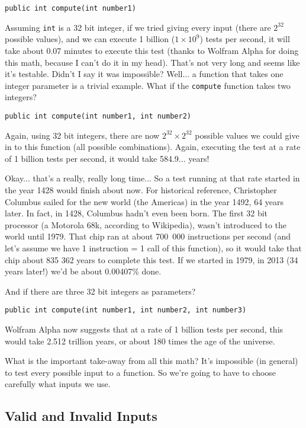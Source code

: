 \texttt{public int compute(int number1)}

Assuming \texttt{int} is a 32 bit integer, if we tried giving every input (there are $2^{32}$ possible values), and we can execute 1 billion ($1 \times 10^{9}$) tests per second, it will take about 0.07 minutes to execute this test (thanks to Wolfram Alpha for doing this math, because I can't do it in my head). That's not very long and seems like it's testable. Didn't I say it was impossible? Well... a function that takes one integer parameter is a trivial example. What if the \texttt{compute} function takes two integers?

\texttt{public int compute(int number1, int number2)}

Again, using 32 bit integers, there are now $2^{32} \times 2^{32}$ possible values we could give in to this function (all possible combinations). Again, executing the test at a rate of 1 billion tests per second, it would take 584.9... years!

Okay... that's a really, really long time... So a test running at that rate started in the year 1428 would finish about now. For historical reference, Christopher Columbus sailed for the new world (the Americas) in the year 1492, 64 years later. In fact, in 1428, Columbus hadn't even been born. The first 32 bit processor (a Motorola 68k, according to Wikipedia), wasn't introduced to the world until 1979. That chip ran at about 700~000 instructions per second (and let's assume we have 1 instruction = 1 call of this function), so it would take that chip about 835 362 years to complete this test. If we started in 1979, in 2013 (34 years later!) we'd be about 0.00407\% done.

And if there are three 32 bit integers as parameters?

\texttt{public int compute(int number1, int number2, int number3)}

Wolfram Alpha now suggests that at a rate of 1 billion tests per second, this would take 2.512 trillion years, or about 180 times the age of the universe.

What is the important take-away from all this math? It's impossible (in general) to test every possible input to a function. So we're going to have to choose carefully what inputs we use.

\subsection*{Valid and Invalid Inputs}

